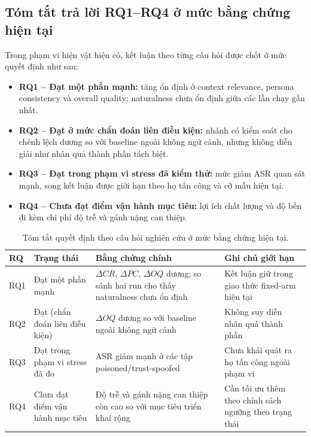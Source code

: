 ﻿\documentclass[a4paper,12pt]{article}
\begin{document}
\subsection{Tóm tắt trả lời RQ1--RQ4 ở mức bằng chứng hiện tại}
Trong phạm vi hiện vật hiện có, kết luận theo từng câu hỏi được chốt ở mức quyết định như sau:
\begin{itemize}[leftmargin=1.5em]
  \item \textbf{RQ1 -- Đạt một phần mạnh:} tăng ổn định ở context relevance, persona consistency và overall quality; naturalness chưa ổn định giữa các lần chạy gần nhất.
  \item \textbf{RQ2 -- Đạt ở mức chẩn đoán liên điều kiện:} nhánh có kiểm soát cho chênh lệch dương so với baseline ngoài không ngữ cảnh, nhưng không diễn giải như nhân quả thành phần tách biệt.
  \item \textbf{RQ3 -- Đạt trong phạm vi stress đã kiểm thử:} mức giảm ASR quan sát mạnh, song kết luận được giới hạn theo họ tấn công và cỡ mẫu hiện tại.
  \item \textbf{RQ4 -- Chưa đạt điểm vận hành mục tiêu:} lợi ích chất lượng và độ bền đi kèm chi phí độ trễ và gánh nặng can thiệp.
\end{itemize}

\begin{table}[t]
\centering
\caption{Tóm tắt quyết định theo câu hỏi nghiên cứu ở mức bằng chứng hiện tại.}
\label{tab:rq_decision_summary}
\begingroup
\footnotesize
\setlength{\tabcolsep}{4pt}
\begin{tabular}{p{}p{}p{}p{}}
\toprule
RQ & Trạng thái & Bằng chứng chính & Ghi chú giới hạn \\
\midrule
RQ1 & Đạt một phần mạnh & \(\Delta CR\), \(\Delta PC\), \(\Delta OQ\) dương; so sánh hai run cho thấy naturalness chưa ổn định & Kết luận giữ trong giao thức fixed-arm hiện tại \\
RQ2 & Đạt (chẩn đoán liên điều kiện) & \(\Delta OQ\) dương so với baseline ngoài không ngữ cảnh & Không suy diễn nhân quả thành phần \\
RQ3 & Đạt trong phạm vi stress đã đo & ASR giảm mạnh ở các tập poisoned/trust-spoofed & Chưa khái quát ra họ tấn công ngoài phạm vi \\
RQ4 & Chưa đạt điểm vận hành mục tiêu & Độ trễ và gánh nặng can thiệp còn cao so với mục tiêu triển khai rộng & Cần tối ưu thêm theo chính sách ngưỡng theo trạng thái \\
\bottomrule
\end{tabular}
\endgroup
\end{table}
\end{document}
